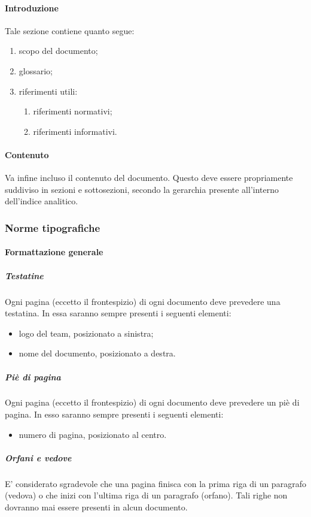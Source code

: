			\paragraph{Introduzione}
				Tale sezione contiene quanto segue:
				\begin{enumerate}
					\item scopo del documento;
					\item glossario;
					\item riferimenti utili:
					\begin{enumerate}
						\item riferimenti normativi;
						\item riferimenti informativi.
					\end{enumerate}
				\end{enumerate}
			\paragraph{Contenuto}
				Va infine incluso il contenuto del documento. Questo deve essere propriamente suddiviso in sezioni e sottosezioni, secondo la gerarchia presente all’interno dell’indice analitico.
		\subsubsection{Norme tipografiche}
			\paragraph{Formattazione generale}
				\subparagraph{Testatine}
					Ogni pagina (eccetto il frontespizio) di ogni documento deve prevedere una testatina. In essa saranno sempre presenti i seguenti elementi:
					\begin{itemize}
						\item logo del team, posizionato a sinistra;
						\item nome del documento, posizionato a destra.
					\end{itemize}
				\subparagraph{Piè di pagina}
					Ogni pagina (eccetto il frontespizio) di ogni documento deve prevedere un piè di pagina. In esso saranno sempre presenti i seguenti elementi:
					\begin{itemize}
						\item numero di pagina, posizionato al centro.
					\end{itemize}
				\subparagraph{Orfani e vedove}
					E’ considerato sgradevole che una pagina finisca con la prima riga di un paragrafo (vedova) o che inizi con l’ultima riga di un paragrafo (orfano). Tali righe non dovranno mai essere presenti in alcun documento.
